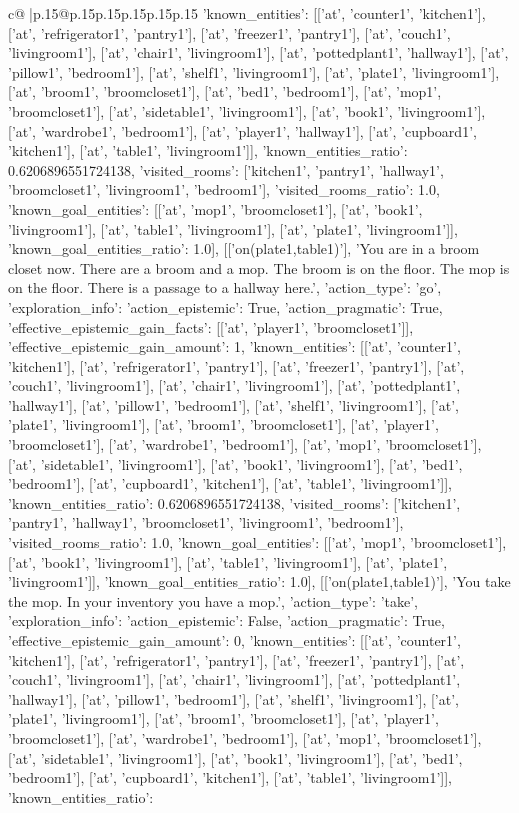 \documentclass{article}
\begin{document}
{\begin{supertabular}{c@{$\;$}|p{.15\linewidth}@{}p{.15\linewidth}p{.15\linewidth}p{.15\linewidth}p{.15\linewidth}p{.15\linewidth}}
{{{'known_entities': [['at', 'counter1', 'kitchen1'], ['at', 'refrigerator1', 'pantry1'], ['at', 'freezer1', 'pantry1'], ['at', 'couch1', 'livingroom1'], ['at', 'chair1', 'livingroom1'], ['at', 'pottedplant1', 'hallway1'], ['at', 'pillow1', 'bedroom1'], ['at', 'shelf1', 'livingroom1'], ['at', 'plate1', 'livingroom1'], ['at', 'broom1', 'broomcloset1'], ['at', 'bed1', 'bedroom1'], ['at', 'mop1', 'broomcloset1'], ['at', 'sidetable1', 'livingroom1'], ['at', 'book1', 'livingroom1'], ['at', 'wardrobe1', 'bedroom1'], ['at', 'player1', 'hallway1'], ['at', 'cupboard1', 'kitchen1'], ['at', 'table1', 'livingroom1']], 'known_entities_ratio': 0.6206896551724138, 'visited_rooms': ['kitchen1', 'pantry1', 'hallway1', 'broomcloset1', 'livingroom1', 'bedroom1'], 'visited_rooms_ratio': 1.0, 'known_goal_entities': [['at', 'mop1', 'broomcloset1'], ['at', 'book1', 'livingroom1'], ['at', 'table1', 'livingroom1'], ['at', 'plate1', 'livingroom1']], 'known_goal_entities_ratio': 1.0}}], [['on(plate1,table1)'], 'You are in a broom closet now. There are a broom and a mop. The broom is on the floor. The mop is on the floor. There is a passage to a hallway here.', {'action_type': 'go', 'exploration_info': {'action_epistemic': True, 'action_pragmatic': True, 'effective_epistemic_gain_facts': [['at', 'player1', 'broomcloset1']], 'effective_epistemic_gain_amount': 1, 'known_entities': [['at', 'counter1', 'kitchen1'], ['at', 'refrigerator1', 'pantry1'], ['at', 'freezer1', 'pantry1'], ['at', 'couch1', 'livingroom1'], ['at', 'chair1', 'livingroom1'], ['at', 'pottedplant1', 'hallway1'], ['at', 'pillow1', 'bedroom1'], ['at', 'shelf1', 'livingroom1'], ['at', 'plate1', 'livingroom1'], ['at', 'broom1', 'broomcloset1'], ['at', 'player1', 'broomcloset1'], ['at', 'wardrobe1', 'bedroom1'], ['at', 'mop1', 'broomcloset1'], ['at', 'sidetable1', 'livingroom1'], ['at', 'book1', 'livingroom1'], ['at', 'bed1', 'bedroom1'], ['at', 'cupboard1', 'kitchen1'], ['at', 'table1', 'livingroom1']], 'known_entities_ratio': 0.6206896551724138, 'visited_rooms': ['kitchen1', 'pantry1', 'hallway1', 'broomcloset1', 'livingroom1', 'bedroom1'], 'visited_rooms_ratio': 1.0, 'known_goal_entities': [['at', 'mop1', 'broomcloset1'], ['at', 'book1', 'livingroom1'], ['at', 'table1', 'livingroom1'], ['at', 'plate1', 'livingroom1']], 'known_goal_entities_ratio': 1.0}}], [['on(plate1,table1)'], 'You take the mop. In your inventory you have a mop.', {'action_type': 'take', 'exploration_info': {'action_epistemic': False, 'action_pragmatic': True, 'effective_epistemic_gain_amount': 0, 'known_entities': [['at', 'counter1', 'kitchen1'], ['at', 'refrigerator1', 'pantry1'], ['at', 'freezer1', 'pantry1'], ['at', 'couch1', 'livingroom1'], ['at', 'chair1', 'livingroom1'], ['at', 'pottedplant1', 'hallway1'], ['at', 'pillow1', 'bedroom1'], ['at', 'shelf1', 'livingroom1'], ['at', 'plate1', 'livingroom1'], ['at', 'broom1', 'broomcloset1'], ['at', 'player1', 'broomcloset1'], ['at', 'wardrobe1', 'bedroom1'], ['at', 'mop1', 'broomcloset1'], ['at', 'sidetable1', 'livingroom1'], ['at', 'book1', 'livingroom1'], ['at', 'bed1', 'bedroom1'], ['at', 'cupboard1', 'kitchen1'], ['at', 'table1', 'livingroom1']], 'known_entities_ratio': }}}
\end{supertabular}}
\end{document}
